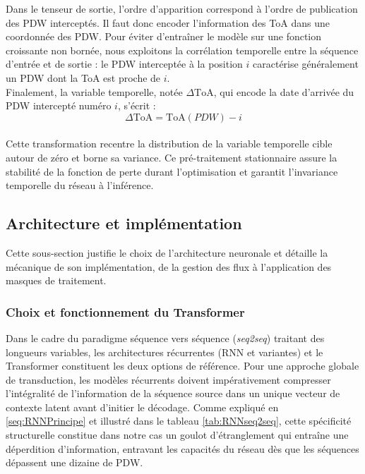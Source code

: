 Dans le tenseur de sortie, l'ordre d'apparition correspond à l'ordre de publication des PDW interceptés. Il faut donc encoder l'information des ToA dans une coordonnée des PDW. Pour éviter d'entraîner le modèle sur une fonction croissante non bornée, nous exploitons la corrélation temporelle entre la séquence d'entrée et de sortie : le PDW interceptée à la position $i$ caractérise généralement un PDW dont la ToA est proche de $i$.\\

Finalement, la variable temporelle, notée $\Delta\text{ToA}$, qui encode la date d'arrivée du PDW intercepté numéro $i$, s'écrit :
\begin{equation}
\label{eq:timeencodingout}
\Delta\text{ToA} = \text{ToA}(PDW) - i
\end{equation}
\, \\

Cette transformation recentre la distribution de la variable temporelle cible autour de zéro et borne sa variance. Ce pré-traitement stationnaire assure la stabilité de la fonction de perte durant l'optimisation et garantit l'invariance temporelle du réseau à l'inférence.

\subsection{Architecture et implémentation}
Cette sous-section justifie le choix de l'architecture neuronale et détaille la mécanique de son implémentation, de la gestion des flux à l'application des masques de traitement.

\subsubsection{Choix et fonctionnement du Transformer}
\label{seq:Transfonc}
Dans le cadre du paradigme séquence vers séquence (\textit{seq2seq}) traitant des longueurs variables, les architectures récurrentes (RNN et variantes) et le Transformer constituent les deux options de référence. Pour une approche globale de transduction, les modèles récurrents doivent impérativement compresser l'intégralité de l'information de la séquence source dans un unique vecteur de contexte latent avant d'initier le décodage. Comme expliqué en \ref{seq:RNNPrincipe} et illustré dans le tableau \ref{tab:RNNseq2seq}, cette spécificité structurelle constitue dans notre cas un goulot d'étranglement qui entraîne une déperdition d'information, entravant les capacités du réseau dès que les séquences dépassent une dizaine de PDW.

